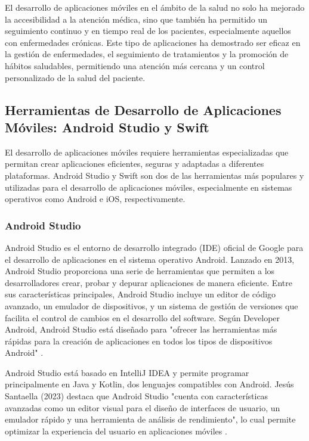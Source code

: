 El desarrollo de aplicaciones móviles en el ámbito de la salud no solo ha mejorado la accesibilidad a la atención médica, sino que también ha permitido un seguimiento continuo y en tiempo real de los pacientes, especialmente aquellos con enfermedades crónicas. Este tipo de aplicaciones ha demostrado ser eficaz en la gestión de enfermedades, el seguimiento de tratamientos y la promoción de hábitos saludables, permitiendo una atención más cercana y un control personalizado de la salud del paciente.

\subsection{Herramientas de Desarrollo de Aplicaciones Móviles: Android Studio y Swift}

El desarrollo de aplicaciones móviles requiere herramientas especializadas que permitan crear aplicaciones eficientes, seguras y adaptadas a diferentes plataformas. Android Studio y Swift son dos de las herramientas más populares y utilizadas para el desarrollo de aplicaciones móviles, especialmente en sistemas operativos como Android e iOS, respectivamente.

\subsubsection{Android Studio}

Android Studio es el entorno de desarrollo integrado (IDE) oficial de Google para el desarrollo de aplicaciones en el sistema operativo Android. Lanzado en 2013, Android Studio proporciona una serie de herramientas que permiten a los desarrolladores crear, probar y depurar aplicaciones de manera eficiente. Entre sus características principales, Android Studio incluye un editor de código avanzado, un emulador de dispositivos, y un sistema de gestión de versiones que facilita el control de cambios en el desarrollo del software. Según Developer Android, Android Studio está diseñado para "ofrecer las herramientas más rápidas para la creación de aplicaciones en todos los tipos de dispositivos Android" \parencite{developerandroid2023}.

Android Studio está basado en IntelliJ IDEA y permite programar principalmente en Java y Kotlin, dos lenguajes compatibles con Android. Jesús Santaella (2023) destaca que Android Studio "cuenta con características avanzadas como un editor visual para el diseño de interfaces de usuario, un emulador rápido y una herramienta de análisis de rendimiento", lo cual permite optimizar la experiencia del usuario en aplicaciones móviles \parencite{santaella2023}.

